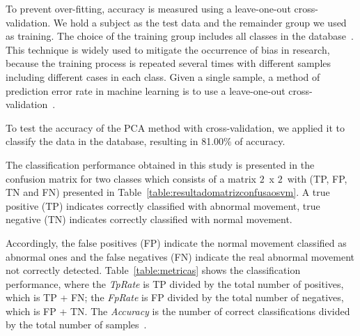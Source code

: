 \documentclass[10pt, conference, compsocconf]{IEEEtran}
\begin{document}
%  
%

To prevent over-fitting, accuracy is measured using a leave-one-out cross-validation. We hold a subject as the test data and the remainder group we used as training. The choice of the training group includes all classes in the database~\cite{datamining2005}. This technique is widely used to mitigate the occurrence of bias in research, because the training process is repeated several times with different samples including different cases in each class. Given a single sample, a method of prediction error rate in machine learning is to use a leave-one-out cross-validation~\cite{datamining2005}.
%
%

To test the accuracy of the PCA method with cross-validation, we applied it to classify the data in the database, resulting in 81.00$\%$ of accuracy.

The classification performance obtained in this study is presented in the confusion matrix for two classes which consists of a matrix $2$\ x $2$\, with (TP, FP, TN and FN) presented in Table~\ref{table:resultadomatrizconfusaosvm}. A true positive (TP) indicates correctly classified with abnormal movement, true negative (TN) indicates correctly classified with normal movement. 

Accordingly, the false positives (FP) indicate the normal movement classified as abnormal ones and the false negatives (FN) indicate the real abnormal movement not correctly detected. Table~\ref{table:metricas} shows the classification performance, where the \textit{TpRate} is TP divided by the total number of positives, which is TP + FN; the \textit{FpRate} is FP divided by the total number of negatives, which is FP + TN. The \textit{Accuracy} is the number of correct classifications divided by the total number of samples~\cite{datamining2005}.
\end{document}
